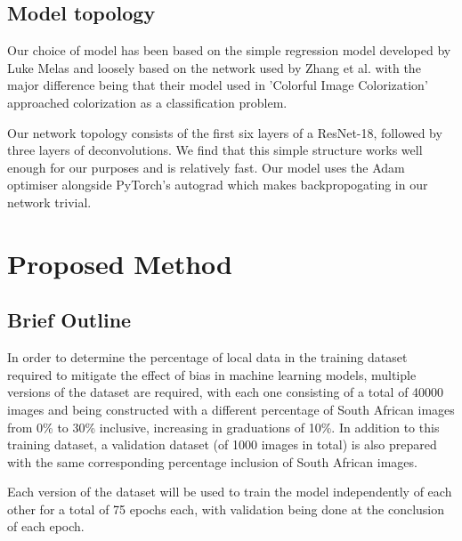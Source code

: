 \documentclass[conference]{IEEEtran}
\begin{document}
\subsection{Model topology}

Our choice of model has been based on the simple regression model developed by Luke Melas and loosely based on the network used by Zhang et al. \cite{zhang2016colorful} with the major difference being that their model used in 'Colorful Image Colorization'\cite{zhang2016colorful} approached colorization as a classification problem.

Our network topology consists of the first six layers of a ResNet-18, followed by three layers of deconvolutions. We find that this simple structure works well enough for our purposes and is relatively fast. Our model uses the Adam optimiser alongside PyTorch's autograd which makes backpropogating in our network trivial.

\section{Proposed Method}

%
%
%
%
%
%

\subsection{Brief Outline}

In order to determine the percentage of local data in the training dataset required to mitigate the effect of bias in machine learning models, multiple versions of the dataset are required, with each one consisting of a total of 40000 images and being constructed with a different percentage of South African images from 0\% to 30\% inclusive, increasing in graduations of 10\%. In addition to this training dataset, a validation dataset (of 1000 images in total) is also prepared with the same corresponding percentage inclusion of South African images.

Each version of the dataset will be used to train the model independently of each other for a total of 75 epochs each, with validation being done at the conclusion of each epoch. 
\end{document}
